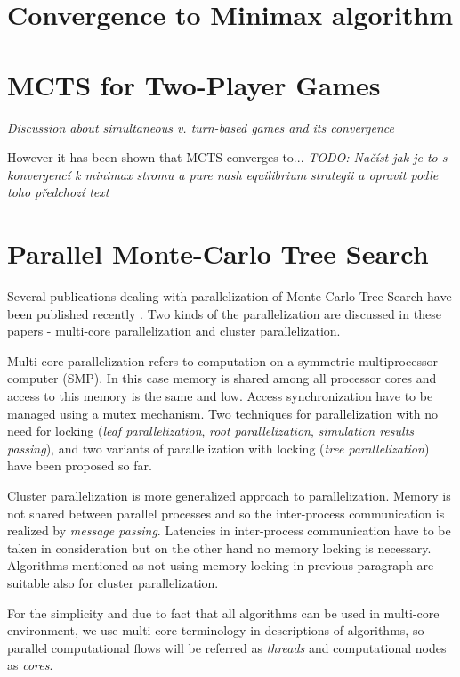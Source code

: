 \section{Convergence to Minimax algorithm}
\label{sec_minimax_convergence}



\section{MCTS for Two-Player Games}
\emph{Discussion about simultaneous v. turn-based games and its convergence}

However it has been shown that MCTS converges to... \emph{TODO: Načíst jak je to s konvergencí k
minimax stromu a pure nash equilibrium strategii a opravit podle toho předchozí text}


\section{Parallel Monte-Carlo Tree Search}
\label{sec_parallel_mcts}

Several publications dealing with parallelization of Monte-Carlo Tree Search have been published
recently \cites{Cazenave2007}{Chaslot2008}{Teytaud2008}. Two kinds of the parallelization are
discussed in these papers - multi-core parallelization and cluster parallelization.

Multi-core parallelization refers to computation on a symmetric multiprocessor computer (SMP). In
this case memory is shared among all processor cores and access to this memory is the same and low.
Access synchronization have to be managed using a mutex mechanism. Two techniques for
parallelization with no need for locking (\emph{leaf parallelization}, \emph{root parallelization},
\emph{simulation results passing}),
and two variants of parallelization with locking (\emph{tree parallelization}) have been proposed so
far. 

Cluster parallelization is more generalized approach to parallelization. Memory is not shared
between parallel processes and so the inter-process communication is realized by \emph{message
passing}. Latencies in inter-process communication have to be taken in consideration but on the
other hand no memory locking is necessary. Algorithms mentioned as not using memory locking in
previous paragraph are suitable also for cluster parallelization.

For the simplicity and due to fact that all algorithms can be used in multi-core environment, we 
use multi-core terminology in descriptions of algorithms, so parallel
computational flows will be referred as \emph{threads} and computational nodes as \emph{cores}.

